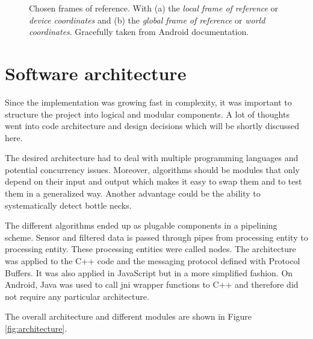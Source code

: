 \begin{figure}[hbt!]
\begin{subfigure}{0.4\textwidth}
        \caption{}
    \end{subfigure}
    \caption{Chosen frames of reference. With (a) the \textit{local frame of reference} or \textit{device coordinates} and (b) the \textit{global frame of reference} or \textit{world coordinates}. Gracefully taken from Android documentation.\cite{android_sdk_sensorevent}}
    \label{fig:frames_of_reference}
\end{figure}

\section{Software architecture}

Since the implementation was growing fast in complexity, it was important to structure the project into logical and modular components. A lot of thoughts went into code architecture and design decisions which will be shortly discussed here.

The desired architecture had to deal with multiple programming languages and potential concurrency issues. Moreover, algorithms should be modules that only depend on their input and output which makes it easy to swap them and to test them in a generalized way. Another advantage could be the ability to systematically detect bottle necks.

The different algorithms ended up as plugable components in a pipelining scheme. Sensor and filtered data is passed through pipes from processing entity to processing entity. These processing entities were called nodes. The architecture was applied to the C++ code and the messaging protocol defined with Protocol Buffers. It was also applied in JavaScript but in a more simplified fashion. On Android, Java was used to call \gls{jni} wrapper functions to C++ and therefore did not require any particular architecture.

The overall architecture and different modules are shown in Figure \ref{fig:architecture}.

